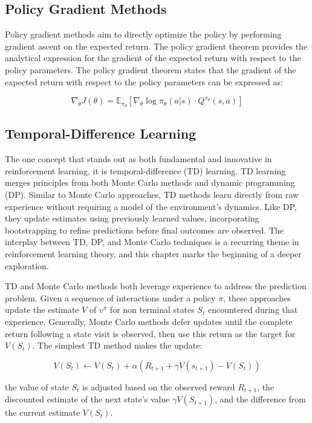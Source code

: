 \subsection{Policy Gradient Methods}
Policy gradient methods aim to directly optimize the policy by performing gradient ascent on the expected return. The policy gradient theorem provides the analytical expression for the gradient of the expected return with respect to the policy parameters. The policy gradient theorem states that the gradient of the expected return with respect to the policy parameters can be expressed as:

\begin{equation*}
    \nabla_\theta J(\theta) = \mathbb{E}_{\pi_\theta}\left[\nabla_\theta \log \pi_\theta(a|s) \cdot Q^{\pi_\theta}(s,a)\right]
\end{equation*}

\subsection{Temporal-Difference Learning}
The one concept that stands out as both fundamental and innovative in reinforcement learning, it is temporal-difference (TD) learning. TD learning merges principles from both Monte Carlo methods and dynamic programming (DP). Similar to Monte Carlo approaches, TD methods learn directly from raw experience without requiring a model of the environment's dynamics. Like DP, they update estimates using previously learned values, incorporating bootstrapping to refine predictions before final outcomes are observed. The interplay between TD, DP, and Monte Carlo techniques is a recurring theme in reinforcement learning theory, and this chapter marks the beginning of a deeper exploration.

TD and Monte Carlo methods both leverage experience to address the prediction problem. Given a sequence of interactions under a policy $\pi$, these approaches update the estimate $V$ of $v^\pi$ for non terminal states $S_t$ encountered during that experience. Generally, Monte Carlo methods defer updates until the complete return following a state visit is observed, then use this return as the target for $V(S_t)$.
The simplest TD method makes the update:

\begin{equation*}
    V(S_t) \leftarrow V(S_t) + \alpha\left(R_{t+1} + \gamma V(s_{t+1}) - V(S_t)\right)
\end{equation*}

 the value of state $S_t$ is adjusted based on the observed reward $R_{t+1}$, the discounted estimate of the next state's value $\gamma V(S_{t+1})$, and the difference from the current estimate $V(S_t)$.

